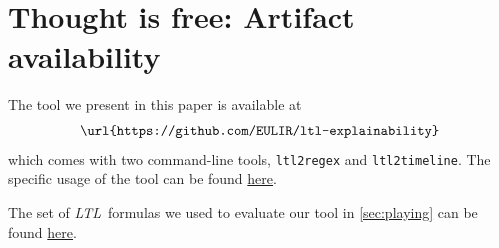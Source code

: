 \documentclass[conference]{IEEEtran}
\theoremstyle{definition}
\theoremstyle{remark}
\newcommand{\ltl}{\textit{LTL}}
\newcommand{\tool}{\texttt{ltl2timeline}}
\begin{document}




\section{Thought is free\textsuperscript{\textsection}: Artifact availability}
\begingroup\renewcommand\thefootnote{\textsection}
\endgroup
The tool we present in this paper is available at
\[
    \texttt{\url{https://github.com/EULIR/ltl-explainability}}
\]
which comes with two command-line tools, \texttt{ltl2regex} and \tool. The specific usage of the tool can be found  \href{https://github.com/EULIR/ltl-explainability#usage}{here}.

The set of \ltl\ formulas we used to evaluate our tool in \cref{sec:playing} can be found \href{https://github.com/EULIR/ltl-explainability/tree/main/ltl-formulas}{here}.
\end{document}
